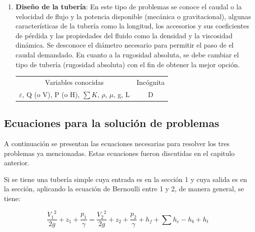 \documentclass[11pt, oneside]{article}
\begin{document}
\begin{enumerate}
\item \textbf{Dise\~no de la tuber\'ia}: En este tipo de problemas se conoce el caudal o la velocidad de flujo y la potencia disponible (mec\'anica o gravitacional), algunas caracter\'isticas de la tuber\'ia como la longitud, los accesorios y sus coeficientes de p\'erdida y las propiedades del fluido como la densidad y la viscosidad din\'amica. Se desconoce el di\'ametro necesario para permitir el paso de el caudal demandado. En cuanto a la rugosidad absoluta, se debe cambiar el tipo de tuber\'ia (rugosidad absoluta) con el fin de obtener la mejor opci\'on. 

\begin{table}[h!]
\centering
\begin{tabular}{c c}
 \hline
 Variables conocidas & Inc\'ognita \\ [0.5ex]
$\varepsilon$, Q (o V), P (o H), $\sum K$, $\rho$, $\mu$, g, L &  D \\
\hline
\end{tabular}
\end{table}
 \end{enumerate}

\subsection{Ecuaciones para la soluci\'on de problemas}
A continuaci\'on se presentan las ecuaciones necesarias para resolver los tres problemas ya mencionadas. Estas ecuaciones fueron discutidas en el capitulo anterior. 

Si se tiene una tuber\'ia simple cuya entrada es en la secci\'on 1 y cuya salida es en la secci\'on, aplicando la ecuaci\'on de Bernoulli entre 1 y 2, de manera general,  se tiene:


\begin{equation}
\frac{{V_1}^2}{2g}+ z_1 + \frac{p_1}{\gamma} =  \frac{{V_2}^2}{2g}+ z_2 + \frac{p_2}{\gamma} + h_f + \sum h_e - h_b + h_t
\label{com1}
\end{equation}
\end{document}
